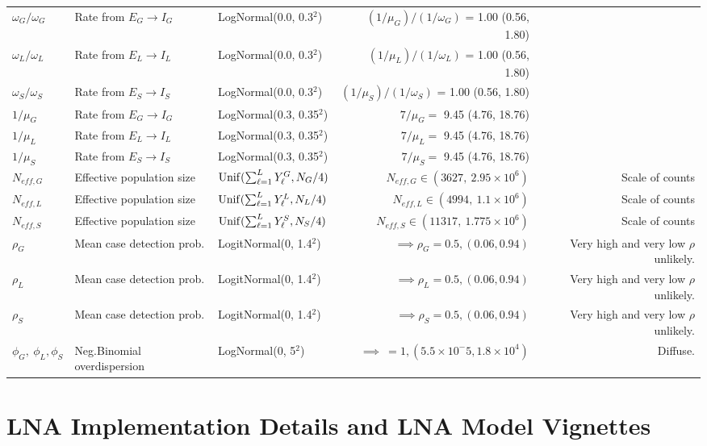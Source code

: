 \begin{table}
\begin{fullpage}
\begin{tabular}{lllrr}
			$ \omega_G/\omega_G $ & Rate from $ E_G\rightarrow I_G $ & LogNormal(0.0, 0.3$ ^2 $) & $ (1/\mu_G)\big/(1/\omega_G) $ = 1.00 (0.56, 1.80) & \cite{chowell2014transmission,velasquez2015time,glynn2017variability} \\
			$ \omega_L/\omega_L $ & Rate from $ E_L\rightarrow I_L $ & LogNormal(0.0, 0.3$ ^2 $) & $ (1/\mu_L)\big/(1/\omega_L) $ = 1.00 (0.56, 1.80) & \cite{chowell2014transmission,velasquez2015time,glynn2017variability} \\
			$ \omega_S/\omega_S $ & Rate from $ E_S\rightarrow I_S $ & LogNormal(0.0, 0.3$ ^2 $) & $ (1/\mu_S)\big/(1/\omega_S) $ = 1.00 (0.56, 1.80) & \cite{chowell2014transmission,velasquez2015time,glynn2017variability} \\
			$ 1/\mu_G $ & Rate from $ E_G\rightarrow I_G $ &  LogNormal(0.3, 0.35$ ^2 $) & $ 7/\mu_G = $ 9.45 (4.76, 18.76) & \cite{chowell2014transmission,velasquez2015time,glynn2017variability} \\
			$ 1/\mu_L $ & Rate from $ E_L\rightarrow I_L $ &  LogNormal(0.3, 0.35$ ^2 $) & $ 7/\mu_L = $ 9.45 (4.76, 18.76) & \cite{chowell2014transmission,velasquez2015time,glynn2017variability} \\
			$ 1/\mu_S $ & Rate from $ E_S\rightarrow I_S $ &  LogNormal(0.3, 0.35$ ^2 $) & $ 7/\mu_S = $ 9.45 (4.76, 18.76) & \cite{chowell2014transmission,velasquez2015time,glynn2017variability} \\
			$ N_{eff,G} $ & Effective population size & $\mathrm{Unif}(\sum_{\ell=1}^{L}Y_\ell^G, N_G/4) $& $ N_{eff,G} \in (3627,\ 2.95\times10^6) $ & Scale of counts \\
			$ N_{eff,L} $ & Effective population size & $\mathrm{Unif}(\sum_{\ell=1}^{L}Y_\ell^L, N_L/4) $& $ N_{eff,L} \in (4994,\ 1.1\times10^6) $ & Scale of counts \\
			$ N_{eff,S} $ & Effective population size & $\mathrm{Unif}(\sum_{\ell=1}^{L}Y_\ell^S, N_S/4) $& $ N_{eff,S} \in (11317,\ 1.775\times10^6) $ & Scale of counts \\
			$ \rho_G $ &  Mean case detection prob. & LogitNormal(0, 1.4$ ^2 $) & $ \implies \rho_G = 0.5, (0.06, 0.94)$ & Very high and very low $ \rho $ unlikely. \\
			$ \rho_L $ &  Mean case detection prob. & LogitNormal(0, 1.4$ ^2 $) & $ \implies \rho_L = 0.5, (0.06, 0.94)$ & Very high and very low $ \rho $ unlikely. \\
			$ \rho_S $ & Mean case detection prob. & LogitNormal(0, 1.4$ ^2 $) & $ \implies \rho_S = 0.5, (0.06, 0.94)$ & Very high and very low $ \rho $ unlikely. \\
			$ \phi_G,\ \phi_L, \phi_S $ &  Neg.Binomial overdispersion & LogNormal(0, 5$ ^2 $) & $ \implies \ = 1, (5.5\times 10^-5, 1.8\times10^4)$ & Diffuse. \\
			\hline
		\end{tabular}
	\end{fullpage}
\end{table}

\section{LNA Implementation Details and LNA Model Vignettes}
\label{sec:lna_implementation_vignettes}